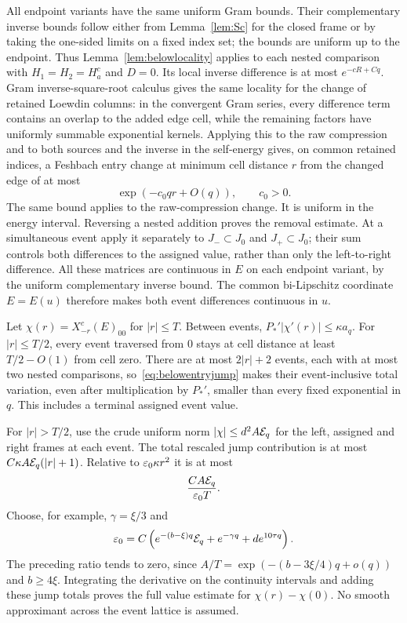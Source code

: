 All endpoint variants have the same uniform Gram bounds. Their complementary inverse bounds follow either from Lemma~\ref{lem:Sc} for the closed frame or by taking the one-sided limits on a fixed index set; the bounds are uniform up to the endpoint. Thus Lemma~\ref{lem:belowlocality} applies to each nested comparison with $H_1=H_2=H_a^c$ and $D=0$. Its local inverse difference is at most $e^{-cR+Cq}$. Gram inverse-square-root calculus gives the same locality for the change of retained Loewdin columns: in the convergent Gram series, every difference term contains an overlap to the added edge cell, while the remaining factors have uniformly summable exponential kernels. Applying this to the raw compression and to both sources and the inverse in the self-energy gives, on common retained indices, a Feshbach entry change at minimum cell distance $r$ from the changed edge of at most
\begin{equation}\label{eq:belowentryjump}
 \exp(-c_0qr+O(q)),\qquad c_0>0.
\end{equation}
The same bound applies to the raw-compression change. It is uniform in the energy interval. Reversing a nested addition proves the removal estimate. At a simultaneous event apply it separately to $J_-\subset J_0$ and $J_+\subset J_0$; their sum controls both differences to the assigned value, rather than only the left-to-right difference. All these matrices are continuous in $E$ on each endpoint variant, by the uniform complementary inverse bound. The common bi-Lipschitz coordinate $E=E(u)$ therefore makes both event differences continuous in $u$.

Let $\chi(r)=X^c_{-r}(E)_{00}$ for $|r|\le T$. Between events,
$P_*'|\chi'(r)|\le\kappa a_q$.
For $|r|\le T/2$, every event traversed from $0$ stays at cell distance at least $T/2-O(1)$ from cell zero. There are at most $2|r|+2$ events, each with at most two nested comparisons, so~\eqref{eq:belowentryjump} makes their event-inclusive total variation, even after multiplication by $P_*'$, smaller than every fixed exponential in $q$. This includes a terminal assigned event value.

For $|r|>T/2$, use the crude uniform norm
$|\chi|\le d^2A\mathcal E_q$ for the left, assigned and right frames at each event. The total rescaled jump contribution is at most
$C\kappa A\mathcal E_q(|r|+1)$. Relative to $\varepsilon_0\kappa r^2$ it is at most
\[
 \frac{CA\mathcal E_q}{\varepsilon_0T}.
\]
Choose, for example, $\gamma=\xi/3$ and
\begin{equation}\label{eq:beloweps}
 \varepsilon_0=C\left(e^{-(b-\xi)q}\mathcal E_q+e^{-\gamma q}
                                      +d e^{10\tau q}\right).
\end{equation}
The preceding ratio tends to zero, since
$A/T=\exp(-(b-3\xi/4)q+o(q))$ and $b\ge4\xi$.
Integrating the derivative on the continuity intervals and adding these jump totals proves the full value estimate for $\chi(r)-\chi(0)$. No smooth approximant across the event lattice is assumed.

